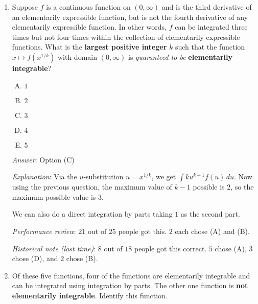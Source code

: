 \documentclass[10pt]{amsart}
\begin{document}
\begin{enumerate}
  {\em Answer}: Option (B)

  {\em Explanation}: Via integration by parts, integrating $f$ $m$ times is
  equivalent to finding antiderivatives for $f(x)$, $xf(x)$, and so on
  till $x^{m-1}f(x)$. In our case, $f$ can be integrated $3$ times, so
  the largest $k$ is $3 - 1 = 2$.

  {\em Performance review}: $21$ out of $25$ people got this. $3$
  chose (C), $1$ chose (D).

  {\em Historical note (last time)}: $5$ out of $18$ people got this
  correct. $6$ chose (D), $5$ chose (C), and $2$ chose (E).

\item Suppose $f$ is a continuous function on $(0,\infty)$ and is the
  third derivative of an elementarily expressible function, but is not
  the fourth derivative of any elementarily expressible function. In
  other words, $f$ can be integrated three times but not four times
  within the collection of elementarily expressible functions. What is
  the {\bf largest positive integer} $k$ such that the function $x
  \mapsto f(x^{1/k})$ with domain $(0,\infty)$ is {\em guaranteed to
  be} {\bf elementarily integrable}?

  \begin{enumerate}[(A)]
  \item $1$
  \item $2$
  \item $3$
  \item $4$
  \item $5$
  \end{enumerate}

  {\em Answer}: Option (C)

  {\em Explanation}: Via the $u$-substitution $u = x^{1/k}$, we get
  $\int ku^{k-1}f(u) \, du$. Now using the previous question, the
  maximum value of $k - 1$ possible is $2$, so the maximum possible
  value is $3$.

  We can also do a direct integration by parts taking $1$ as the
  second part.

  {\em Performance review}: $21$ out of $25$ people got this. $2$ each
  chose (A) and (B).

  {\em Historical note (last time)}: $8$ out of $18$ people got this
  correct. $5$ chose (A), $3$ chose (D), and $2$ chose (B).
  
\item Of these five functions, four of the functions are elementarily
  integrable and can be integrated using integration by parts. The
  other one function is {\bf not elementarily integrable}. Identify
  this function.


\end{enumerate}
\end{document}
